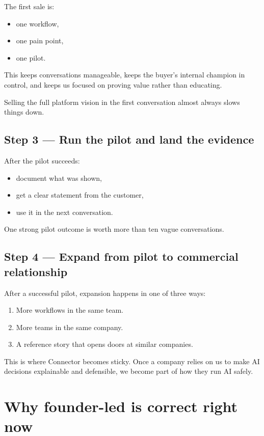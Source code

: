The first sale is:

\begin{itemize}
  \item one workflow,
  \item one pain point,
  \item one pilot.
\end{itemize}

This keeps conversations manageable, keeps the buyer's internal champion in control, and keeps us focused on proving value rather than educating.

Selling the full platform vision in the first conversation almost always slows things down.

\subsection{Step 3 --- Run the pilot and land the evidence}

After the pilot succeeds:

\begin{itemize}
  \item document what was shown,
  \item get a clear statement from the customer,
  \item use it in the next conversation.
\end{itemize}

One strong pilot outcome is worth more than ten vague conversations.

\subsection{Step 4 --- Expand from pilot to commercial relationship}

After a successful pilot, expansion happens in one of three ways:

\begin{enumerate}
  \item More workflows in the same team.
  \item More teams in the same company.
  \item A reference story that opens doors at similar companies.
\end{enumerate}

This is where Connector becomes sticky.
Once a company relies on us to make AI decisions explainable and defensible, we become part of how they run AI safely.

\section{Why founder-led is correct right now}

